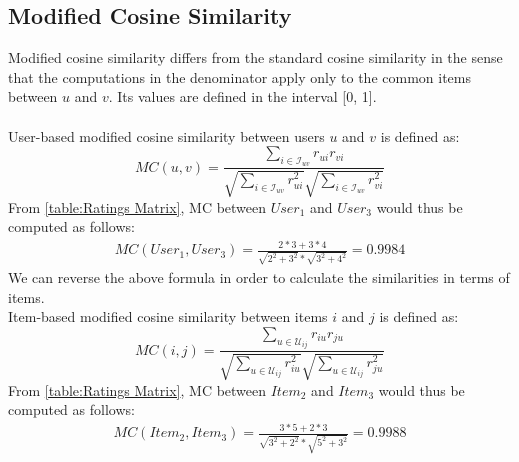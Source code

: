 \subsection{Modified Cosine Similarity}
Modified cosine similarity differs from the standard cosine similarity in the
sense that the computations in the denominator apply only to the common items
between $u$ and $v$.
Its values are defined in the interval [0, 1].\\\\
User-based modified cosine similarity between users $u$ and $v$ is defined as:
\begin{equation}\label{eq:modified_cosine}
    MC(u,v) = \frac{\sum_{i \in \mathcal{I}_{uv}}r_{ui}r_{vi}}
		   {\sqrt{\sum_{i \in \mathcal{I}_{uv}}r_{ui}^2}
                    \sqrt{\sum_{i \in \mathcal{I}_{uv}}r_{vi}^2}}
\end{equation}
From \autoref{table:Ratings Matrix}, MC
between $User_1$ and $User_3$ would thus be computed as follows:
\begin{align*}
MC(User_1,User_3) = \frac{2*3 + 3*4}
					   {\sqrt{2^2 + 3^2} * \sqrt{3^2 + 4^2}} = 0.9984
\end{align*}
We can reverse the above formula in order to calculate the similarities
in terms of items.\\
Item-based modified cosine similarity between items $i$ and $j$ is defined as:
\begin{equation}
    MC(i,j) = \frac{\sum_{u \in \mathcal{U}_{ij}}r_{iu}r_{ju}}
   {\sqrt{\sum_{u \in \mathcal{U}_{ij}}r_{iu}^2}
            \sqrt{\sum_{u \in \mathcal{U}_{ij}}r_{ju}^2}}
\end{equation}
From \autoref{table:Ratings Matrix}, MC
between $Item_2$ and $Item_3$ would thus be computed as follows:
\begin{align*}
MC(Item_2,Item_3) = \frac{3*5 + 2*3}
						{\sqrt{3^2 + 2^2} * \sqrt{5^2 + 3^2}} = 0.9988
\end{align*}
